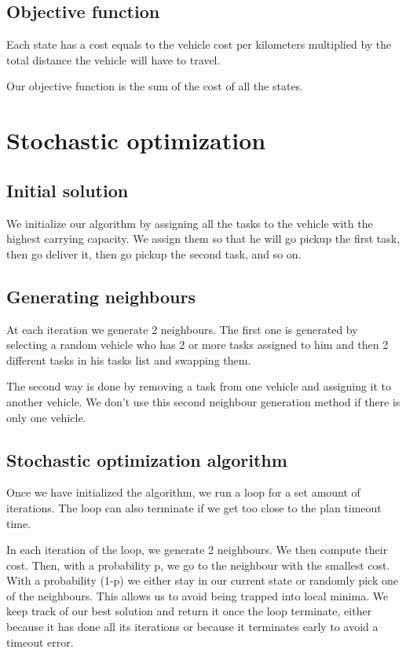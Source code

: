 \documentclass[11pt]{article}
\begin{document}
\subsection{Objective function}
Each state has a cost equals to the vehicle cost per kilometers multiplied by the total distance the vehicle will have to travel.

Our objective function is the sum of the cost of all the states.


\section{Stochastic optimization}

\subsection{Initial solution}
We initialize our algorithm by assigning all the tasks to the vehicle with the highest carrying capacity. We assign them so that he will go pickup the first task, then go deliver it, then go pickup the second task, and so on.

\subsection{Generating neighbours}
At each iteration we generate 2 neighbours. The first one is generated by selecting a random vehicle who has 2 or more tasks assigned to him and then 2 different tasks in his tasks list and swapping them. 

The second way is done by removing a task from one vehicle and assigning it to another vehicle. We don't use this second neighbour generation method if there is only one vehicle.

\subsection{Stochastic optimization algorithm}
Once we have initialized the algorithm, we run a loop for a set amount of iterations. The loop can also terminate if we get too close to the plan timeout time.

In each iteration of the loop, we generate 2 neighbours. We then compute their cost. Then, with a probability p, we go to the neighbour with the smallest cost. With a probability (1-p) we either stay in our current state or randomly pick one of the neighbours. This allows us to avoid being trapped into local minima. We keep track of our best solution and return it once the loop terminate, either because it has done all its iterations or because it terminates early to avoid a timeout error.
\end{document}
